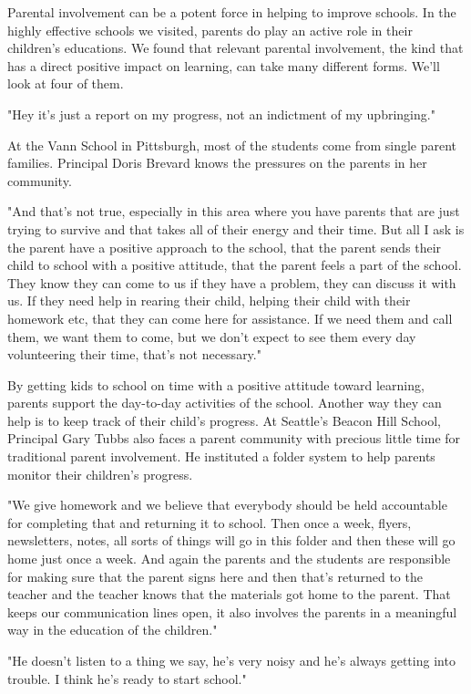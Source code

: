 Parental involvement can be a potent force in helping to improve schools. In the highly effective schools we visited, parents do play an active role in their children's educations. We found that relevant parental involvement, the kind that has a direct positive impact on learning, can take many different forms. We'll look at four of them.

"Hey it's just a report on my progress, not an indictment of my upbringing."

At the Vann School in Pittsburgh, most of the students come from single parent families. Principal Doris Brevard knows the pressures on the parents in her community.

"And that's not true, especially in this area where you have parents that are just trying to survive and that takes all of their energy and their time. But all I ask is the parent have a positive approach to the school, that the parent sends their child to school with a positive attitude, that the parent feels a part of the school. They know they can come to us if they have a problem, they can discuss it with us. If they need help in rearing their child, helping their child with their homework etc, that they can come here for assistance. If we need them and call them, we want them to come, but we don't expect to see them every day volunteering their time, that's not necessary."

By getting kids to school on time with a positive attitude toward learning, parents support the day-to-day activities of the school. Another way they can help is to keep track of their child's progress. At Seattle's Beacon Hill School, Principal Gary Tubbs also faces a parent community with precious little time for traditional parent involvement. He instituted a folder system to help parents monitor their children's progress.

"We give homework and we believe that everybody should be held accountable for completing that and returning it to school. Then once a week, flyers, newsletters, notes, all sorts of things will go in this folder and then these will go home just once a week. And again the parents and the students are responsible for making sure that the parent signs here and then that's returned to the teacher and the teacher knows that the materials got home to the parent. That keeps our communication lines open, it also involves the parents in a meaningful way in the education of the children."

"He doesn't listen to a thing we say, he's very noisy and he's always getting into trouble. I think he's ready to start school."

